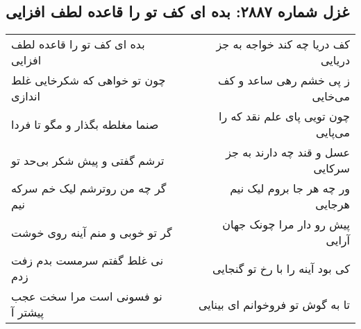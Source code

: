 \begin{center}
\section*{غزل شماره ۲۸۸۷: بده ای کف تو را قاعده لطف افزایی}
\label{sec:2887}
\begin{longtable}{l p{0.5cm} r}
بده ای کف تو را قاعده لطف افزایی
&&
کف دریا چه کند خواجه به جز دریایی
\\
چون تو خواهی که شکرخایی غلط اندازی
&&
ز پی خشم رهی ساعد و کف می‌خایی
\\
صنما مغلطه بگذار و مگو تا فردا
&&
چون تویی پای علم نقد که را می‌پایی
\\
ترشم گفتی و پیش شکر بی‌حد تو
&&
عسل و قند چه دارند به جز سرکایی
\\
گر چه من روترشم لیک خم سرکه نیم
&&
ور چه هر جا بروم لیک نیم هرجایی
\\
گر تو خوبی و منم آینه روی خوشت
&&
پیش رو دار مرا چونک جهان آرایی
\\
نی غلط گفتم سرمست بدم زفت زدم
&&
کی بود آینه را با رخ تو گنجایی
\\
نو فسونی است مرا سخت عجب پیشتر آ
&&
تا به گوش تو فروخوانم ای بینایی
\\
\end{longtable}
\end{center}
